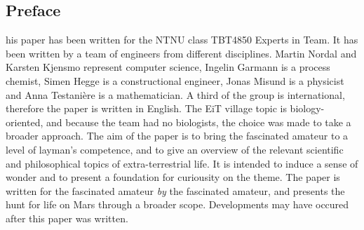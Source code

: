 \subsection{Preface}
his paper has been written for the NTNU class TBT4850 Experts in Team.
It has been written by a team of engineers from different disciplines.
Martin Nordal and Karsten Kjensmo represent computer science, Ingelin Garmann is a process chemist, Simen Hegge is a constructional engineer, Jonas Misund is a physicist and Anna Testani\`{e}re is a mathematician.
A third of the group is international, therefore the paper is written in English. 
The EiT village topic is biology-oriented, and because the team had no biologists, the choice was made to take a broader approach. 
The aim of the paper is to bring the fascinated amateur to a level of layman's competence, and to give an overview of the relevant scientific and philosophical topics of extra-terrestrial life.
It is intended to induce a sense of wonder and to present a foundation for curiousity on the theme. 
The paper is written for the fascinated amateur \emph{by} the fascinated amateur, and presents the hunt for life on Mars through a broader scope. Developments may have occured after this paper was written. 
 